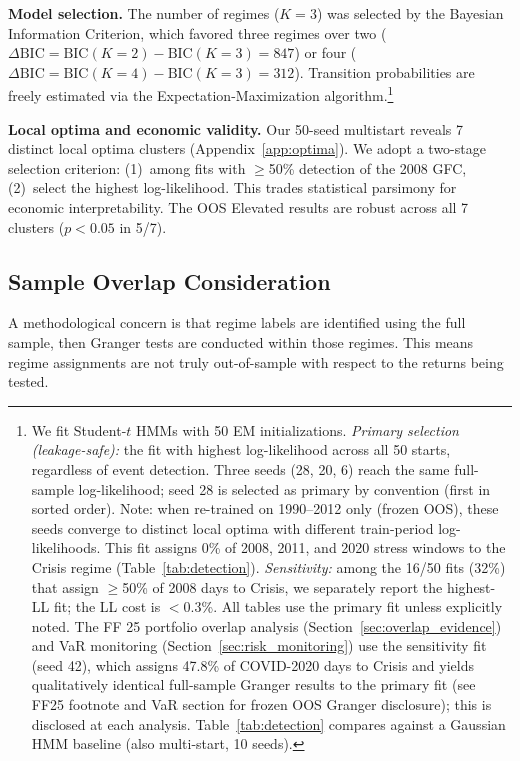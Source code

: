 \documentclass[sigconf,anonymous]{acmart}
\begin{document}
\textbf{Model selection.} The number of regimes ($K=3$) was selected by the Bayesian
Information Criterion, which favored three regimes over two
($\Delta\text{BIC} = \text{BIC}(K{=}2) - \text{BIC}(K{=}3) = 847$) or
four ($\Delta\text{BIC} = \text{BIC}(K{=}4) - \text{BIC}(K{=}3) = 312$). Transition probabilities are freely estimated via the Expectation-Maximization algorithm.\footnote{We fit Student-$t$ HMMs with 50
EM initializations.
\emph{Primary selection (leakage-safe):} the fit with highest log-likelihood across
all 50 starts, regardless of event detection. Three seeds (28, 20, 6) reach the same
full-sample log-likelihood; seed 28 is selected as primary by convention
(first in sorted order). Note: when re-trained on 1990--2012 only (frozen OOS),
these seeds converge to distinct local optima with different train-period log-likelihoods.
This fit assigns 0\% of 2008, 2011, and
2020 stress windows to the Crisis regime (Table~\ref{tab:detection}).
\emph{Sensitivity:} among the 16/50 fits (32\%) that assign $\geq$50\% of 2008
days to Crisis, we separately report the highest-LL fit; the LL cost is $<$0.3\%.
All tables use the primary fit unless explicitly noted.
The FF 25 portfolio overlap analysis (Section~\ref{sec:overlap_evidence}) and VaR
monitoring (Section~\ref{sec:risk_monitoring}) use the sensitivity fit (seed 42),
which assigns 47.8\% of COVID-2020 days to Crisis and yields qualitatively identical
full-sample Granger results to the primary fit (see FF25 footnote and VaR section
for frozen OOS Granger disclosure); this is disclosed at each analysis.
Table~\ref{tab:detection} compares against a Gaussian HMM baseline
(also multi-start, 10 seeds).}

\textbf{Local optima and economic validity.}
Our 50-seed multistart reveals 7 distinct local optima clusters (Appendix~\ref{app:optima}).
We adopt a two-stage selection criterion: (1)~among fits with $\geq$50\% detection
of the 2008 GFC, (2)~select the highest log-likelihood. This trades statistical
parsimony for economic interpretability. The OOS Elevated results are robust
across all 7 clusters ($p < 0.05$ in 5/7).

\subsection{Sample Overlap Consideration}

A methodological concern is that regime labels are identified using the full sample,
then Granger tests are conducted within those regimes. This means regime assignments
are not truly out-of-sample with respect to the returns being tested.
\end{document}
